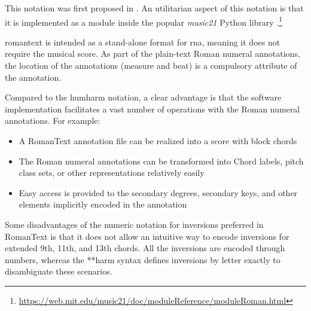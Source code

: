 

This notation was first proposed in
\textcite{gotham2019romantext}. An utilitarian aspect of
this notation is that it is implemented as a module inside
the popular \emph{music21} Python library
\parencite{cuthbert2010music21}.\footnote{\href{https://web.mit.edu/music21/doc/moduleReference/moduleRoman.html}{https://web.mit.edu/music21/doc/moduleReference/moduleRoman.html}}


\gls{romantext} is intended as a stand-alone format for
\gls{rna}, meaning it does not require the musical score. As
part of the plain-text Roman numeral annotations, the
location of the annotations (measure and beat) is a
compulsory attribute of the annotation.

Compared to the \gls{humharm} notation, a clear advantage is
that the software implementation facilitates a vast number
of operations with the Roman numeral annotations. For
example:

\begin{itemize}
    \item A RomanText annotation file can be realized into a
    score with block chords
    \item The Roman numeral annotations can be transformed
    into Chord labels, pitch class sets, or other
    representations relatively easily
    \item Easy access is provided to the secondary degrees,
    secondary keys, and other elements implicitly encoded in
    the annotation
\end{itemize}

Some disadvantages of the numeric notation for inversions
preferred in RomanText is that it does not allow an
intuitive way to encode inversions for extended 9th, 11th,
and 13th chords. All the inversions are encoded through
numbers, whereas the **harm syntax defines inversions by
letter exactly to disambiguate these scenarios.
